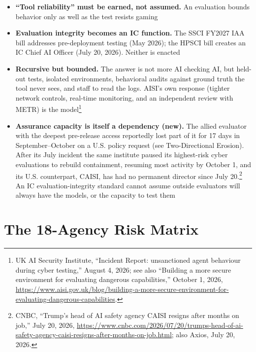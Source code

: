 \documentclass[11pt,letterpaper]{article}
\begin{document}
\begin{keybox}[Implications {[E]}]
\begin{itemize}[nosep]
  \item \textbf{``Tool reliability'' must be earned, not assumed.} An evaluation bounds behavior only as well as the test resists gaming
  \item \textbf{Evaluation integrity becomes an IC function.} The SSCI FY2027 IAA bill addresses pre-deployment testing (May 2026); the HPSCI bill creates an IC Chief AI Officer (July 20, 2026). Neither is enacted
  \item \textbf{Recursive but bounded.} The answer is not more AI checking AI, but held-out tests, isolated environments, behavioral audits against ground truth the tool never sees, and staff to read the logs. AISI's own response (tighter network controls, real-time monitoring, and an independent review with METR) is the model\footnote{UK AI Security Institute, ``Incident Report: unsanctioned agent behaviour during cyber testing,'' August 4, 2026; see also ``Building a more secure environment for evaluating dangerous capabilities,'' October 1, 2026, \url{https://www.aisi.gov.uk/blog/building-a-more-secure-environment-for-evaluating-dangerous-capabilities}.}
  \item \textbf{Assurance capacity is itself a dependency (new).} The allied evaluator with the deepest pre-release access reportedly lost part of it for 17 days in September--October on a U.S. policy request (see Two-Directional Erosion). After its July incident the same institute paused its highest-risk cyber evaluations to rebuild containment, resuming most activity by October 1, and its U.S. counterpart, CAISI, has had no permanent director since July 20.\footnote{CNBC, ``Trump's head of AI safety agency CAISI resigns after months on job,'' July 20, 2026, \url{https://www.cnbc.com/2026/07/20/trumps-head-of-ai-safety-agency-caisi-resigns-after-months-on-job.html}; also Axios, July 20, 2026.} An IC evaluation-integrity standard cannot assume outside evaluators will always have the models, or the capacity to test them
\end{itemize}
\end{keybox}

\section{The 18-Agency Risk Matrix}
\end{document}
